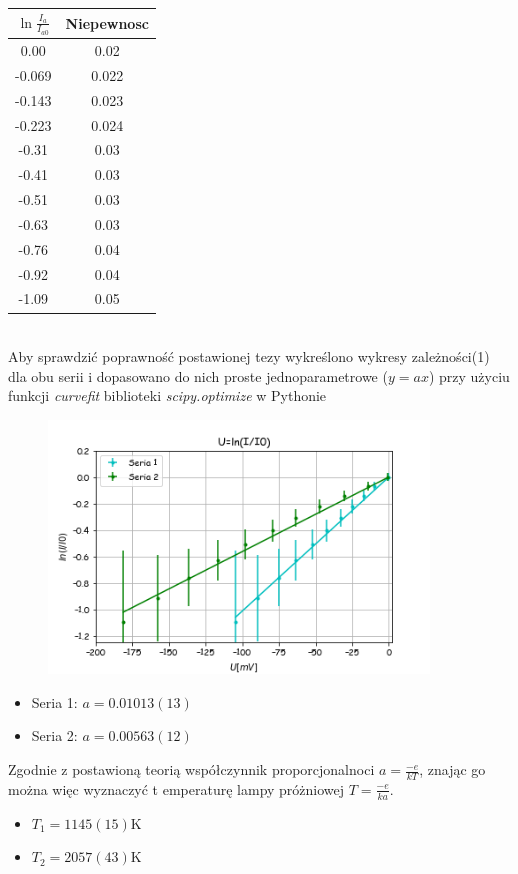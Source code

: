 \documentclass[a4paper,10pt]{article}
\begin{document}
\begin{tabular}{|c c|}
  \toprule

  \hline
  $\ln{\frac{I_a}{I_{a0}}}$ &Niepewnosc \\
  \midrule
   0.00  &0.02  \\\hline
  -0.069 &0.022 \\\hline
  -0.143 &0.023 \\\hline
  -0.223 &0.024 \\\hline
  -0.31  &0.03  \\\hline
  -0.41  &0.03  \\\hline
  -0.51  &0.03\\\hline
  -0.63  &0.03\\\hline
  -0.76  &0.04\\\hline
  -0.92  &0.04\\\hline
  -1.09  &0.05\\\hline
  \bottomrule
\end{tabular}
\\Aby sprawdzić poprawność postawionej tezy wykreślono wykresy zależności(1) dla obu serii i dopasowano do nich
proste jednoparametrowe ($y=ax$) przy użyciu funkcji \emph{curvefit} biblioteki \emph{scipy.optimize} w Pythonie
\begin{figure}[H]
\includegraphics[width=0.9\textwidth]{zarzenie.png}
\end{figure}

\begin{itemize}
  \item Seria 1: $a = 0.01013(13)$
  \item Seria 2: $a = 0.00563(12)$
\end{itemize}

Zgodnie z postawioną teorią współczynnik proporcjonalnoci $a = \frac{-e}{kT}$, znając go można więc wyznaczyć t
emperaturę lampy próżniowej $T = \frac{-e}{ka}$.
\begin{itemize}
  \item $T_1 = 1145(15)$K
  \item $T_2 = 2057(43)$K
\end{itemize}
\end{document}
